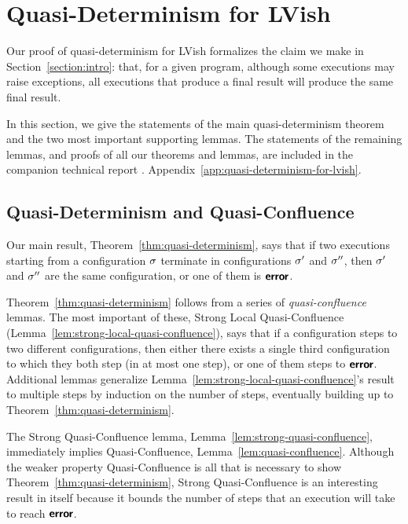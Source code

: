 \section{Quasi-Determinism for LVish}\label{s:quasi-proof}


Our proof of quasi-determinism for LVish formalizes the claim we make
in Section~\ref{section:intro}: that, for a given program, although
some executions may raise exceptions, all executions that produce a
final result will produce the same final result.

In this section, we give the statements of the main
quasi-determinism theorem and the two most important supporting
lemmas.  The statements of the remaining lemmas,
and proofs of all our theorems and lemmas,
are included in
\ifx\fulltr\undefined
the companion
technical report \cite{Freeze-TR}.
\else
Appendix~\ref{app:quasi-determinism-for-lvish}.
\fi

\subsection{Quasi-Determinism and Quasi-Confluence}

Our main result, Theorem~\ref{thm:quasi-determinism}, says that if two
executions starting from a configuration $\sigma$ terminate in
configurations $\sigma'$ and $\sigma''$, then $\sigma'$ and $\sigma''$ are
the same configuration, or one of them is $\textbf{\textsf{error}}$.

\ThmQuasiDeterminism

\noindent Theorem~\ref{thm:quasi-determinism} follows from a series of
\emph{quasi-confluence} lemmas.  The most important of these,
Strong Local Quasi-Confluence (Lemma~\ref{lem:strong-local-quasi-confluence}), says that if a
configuration steps to two different configurations, then either there
exists a single third configuration to which they both step (in at
most one step), or one of them steps to $\textbf{\textsf{error}}$.
Additional lemmas generalize Lemma~\ref{lem:strong-local-quasi-confluence}'s result to multiple
steps by induction on the number of steps, eventually building up to Theorem~\ref{thm:quasi-determinism}.

\LemStrongLocalQuasiConfluence

\noindent The Strong Quasi-Confluence lemma,
Lemma~\ref{lem:strong-quasi-confluence}, immediately implies
Quasi-Confluence, Lemma~\ref{lem:quasi-confluence}.  Although the
weaker property Quasi-Confluence is all that is necessary to show
Theorem~\ref{thm:quasi-determinism}, Strong Quasi-Confluence is an
interesting result in itself because it bounds the number of steps
that an execution will take to reach $\textbf{\textsf{error}}$.
\fi

